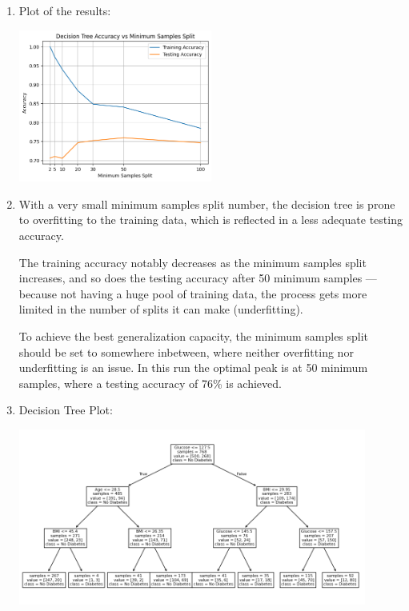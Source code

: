 \documentclass{article}
\begin{document}
\begin{enumerate}[leftmargin=\labelsep]
\vfill

\item Plot of the results:
\begin{center}
    \includegraphics[width=0.5\textwidth]{img/tree_acc_vs_split.png} 
\end{center}

\vfill

\item With a very small minimum samples split number, the decision
tree is prone to overfitting to the training data, which is reflected
in a less adequate testing accuracy.

The training accuracy notably decreases as the minimum samples
split increases, and so does the testing accuracy after 50 minimum
samples --- because not having a huge pool of training data,
the process gets more limited in the number of splits it can make 
(underfitting).

To achieve the best generalization capacity, the minimum samples
split should be set to somewhere inbetween, where neither overfitting
nor underfitting is an issue. In this run the optimal peak is at 50 
minimum samples, where a testing accuracy of 76\% is achieved.

\vfill
\newpage

\item Decision Tree Plot:
    \begin{center}
        \includegraphics[width=0.9\textwidth]{img/tree_plot.png} 
    \end{center}


\end{enumerate}
\end{document}
